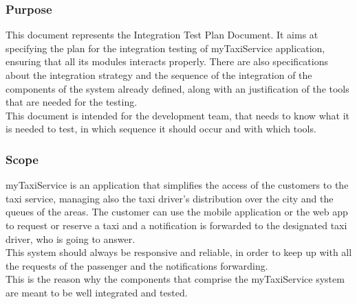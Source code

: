 \documentclass[18pt,oneside,a4paper, titlepage]{article}
\begin{document}
		\subsubsection{Purpose}
		This document represents the Integration Test Plan Document. It aims at specifying the plan for the integration testing of myTaxiService application, ensuring that all its modules interacts properly. There are also specifications about the integration strategy and the sequence of the integration of the components of the system already defined, along with an justification of the tools that are needed for the testing.\\
		This document is intended for the development team, that needs to know what it is needed to test, in which sequence it should occur and with which tools.
		\subsubsection{Scope}
		myTaxiService is an application that simplifies the access of the customers to the taxi service, managing also the taxi driver's distribution over the city and the queues of the areas. The customer can use the mobile application or the web app to request or reserve a taxi and a notification is forwarded to the designated taxi driver, who is going to answer.\\ This system should always be responsive and reliable, in order to keep up with all the requests of the passenger and the notifications forwarding.\\ This is the reason why the components that comprise the myTaxiService system are meant to be well integrated and tested.
\end{document}
